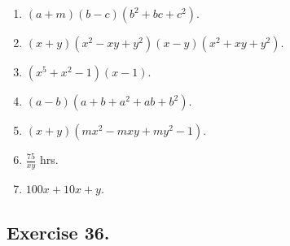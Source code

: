 \documentclass{book}
\begin{document}
\begin{enumerate}
\item $(a + m)(b - c)(b^2 + bc + c^2)$.

\item $(x + y)(x^2 - xy + y^2)(x - y)(x^2 + xy + y^2)$.

\item $(x^5 + x^2 - 1)(x - 1)$.

\item $(a - b)(a + b + a^2 + ab + b^2)$.

\item $(x + y)(mx^2 - mxy + my^2 - 1)$.

\item $\frac{75}{xy}$ hrs.

\item $100x + 10x + y$.
\end{enumerate}

\subsection*{Exercise 36.}
\end{document}
